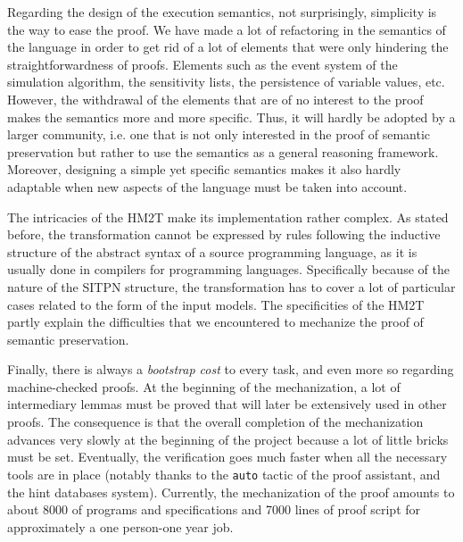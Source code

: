\documentclass[pdflatex,sn-mathphys]{sn-jnl}%
\theoremstyle{thmstyleone}%
\theoremstyle{thmstyletwo}%
\theoremstyle{thmstylethree}%
\begin{document}
Regarding the design of the execution semantics, not surprisingly,
simplicity is the way to ease the proof. We have made a lot of
refactoring in the semantics of the \hvhdl{} language in order to get
rid of a lot of elements that were only hindering the
straightforwardness of proofs. Elements such as the event system of
the \vhdl{} simulation algorithm, the sensitivity lists, the
persistence of variable values, etc. However, the withdrawal of the
elements that are of no interest to the proof makes the semantics more
and more specific. Thus, it will hardly be adopted by a larger
community, i.e. one that is not only interested in the proof of
semantic preservation but rather to use the semantics as a general
reasoning framework. Moreover, designing a simple yet specific
semantics makes it also hardly adaptable when new aspects of the
language must be taken into account.

The intricacies of the HM2T make its \coq{} implementation rather
complex.  As stated before, the transformation cannot be expressed by
rules following the inductive structure of the abstract syntax of a
source programming language, as it is usually done in compilers for
programming languages. Specifically because of the nature of the SITPN
structure, the \hilecop{} transformation has to cover a lot of
particular cases related to the form of the input models. The
specificities of the HM2T partly explain the difficulties that we
encountered to mechanize the proof of semantic preservation.

Finally, there is always a \textit{bootstrap cost} to every task, and
even more so regarding machine-checked proofs. At the beginning of the
mechanization, a lot of intermediary lemmas must be proved that will
later be extensively used in other proofs. The consequence is that the
overall completion of the mechanization advances very slowly at the
beginning of the project because a lot of little bricks must be
set. Eventually, the verification goes much faster when all the
necessary tools are in place (notably thanks to the \texttt{auto}
tactic of the \coq{} proof assistant, and the hint databases
system). Currently, the mechanization of the proof amounts to about
8000 of programs and specifications and 7000 lines of proof script for
approximately a one person-one year job.
\end{document}
